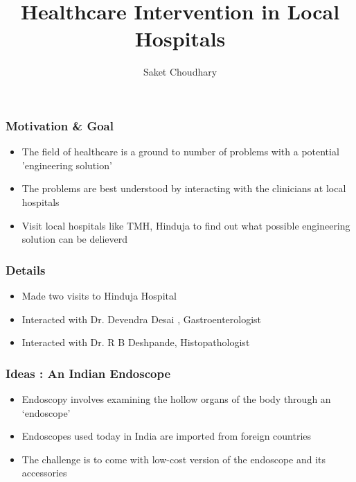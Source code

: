 \documentclass{beamer}
\begin{document}
\title[Analysis of Next Generation Sequencing Data]
{Healthcare Intervention in Local Hospitals
}
\author[\insertframenumber/\inserttotalframenumber
\hspace{1in} Saket Choudhary]
{Saket Choudhary \\
}
\begin{frame}
   \titlepage
\vspace{-1cm}

\end{frame}

\begin{frame}
\frametitle{Motivation \& Goal}
    \begin{itemize}[<only@+-+(4)>]
        \item The  field of healthcare is a ground to number of problems with a potential 'engineering solution'
        \item The problems are best understood by interacting with the clinicians at local hospitals 
        \item Visit local hospitals like TMH, Hinduja to find out what possible engineering solution can be delieverd 
    \end{itemize}
\end{frame}

\begin{frame}
\frametitle{Details}
    \begin{itemize}[<only@+-+(4)>]
        \item  Made two visits to Hinduja Hospital
        \item  Interacted with Dr. Devendra Desai , Gastroenterologist
        \item  Interacted with Dr. R B Deshpande,  Histopathologist
    \end{itemize}
\end{frame}

\begin{frame}
\frametitle{Ideas : An  Indian Endoscope}
    \begin{itemize}[<only@+-+(4)>]
        \item  Endoscopy involves examining the hollow organs of the body through an ‘endoscope’
        \item  Endoscopes used today in India are imported from foreign countries
        \item  The challenge is to come with low-cost version of the endoscope and its accessories
    \end{itemize}
\end{frame}
\end{document}
